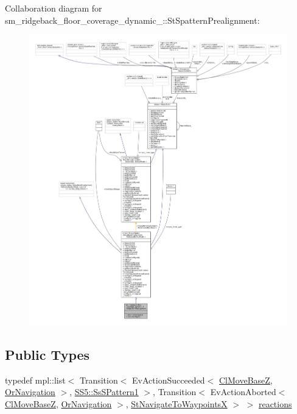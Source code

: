 Collaboration diagram for sm\+\_\+ridgeback\+\_\+floor\+\_\+coverage\+\_\+dynamic\+\_\+:\+:St\+Spattern\+Prealignment\+:
\nopagebreak
\begin{figure}[H]
\begin{center}
\leavevmode
\includegraphics[width=350pt]{structsm__ridgeback__floor__coverage__dynamic__1_1_1StSpatternPrealignment__coll__graph}
\end{center}
\end{figure}
\subsection*{Public Types}
\begin{DoxyCompactItemize}
\item 
typedef mpl\+::list$<$ Transition$<$ Ev\+Action\+Succeeded$<$ \hyperlink{classcl__move__base__z_1_1ClMoveBaseZ}{Cl\+Move\+BaseZ}, \hyperlink{classsm__ridgeback__floor__coverage__dynamic__1_1_1OrNavigation}{Or\+Navigation} $>$, \hyperlink{structsm__ridgeback__floor__coverage__dynamic__1_1_1SS5_1_1SsSPattern1}{S\+S5\+::\+Ss\+S\+Pattern1} $>$, Transition$<$ Ev\+Action\+Aborted$<$ \hyperlink{classcl__move__base__z_1_1ClMoveBaseZ}{Cl\+Move\+BaseZ}, \hyperlink{classsm__ridgeback__floor__coverage__dynamic__1_1_1OrNavigation}{Or\+Navigation} $>$, \hyperlink{structsm__ridgeback__floor__coverage__dynamic__1_1_1StNavigateToWaypointsX}{St\+Navigate\+To\+WaypointsX} $>$ $>$ \hyperlink{structsm__ridgeback__floor__coverage__dynamic__1_1_1StSpatternPrealignment_a4af4b4f5afa7590529a14f429fe7432a}{reactions}
\end{DoxyCompactItemize}
